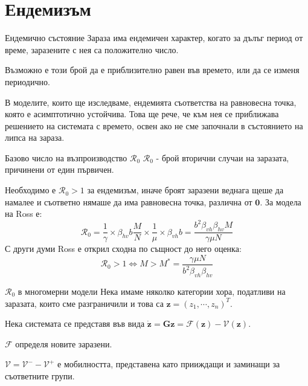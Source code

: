 \section{Ендемизъм}
\begin{frame}[t]{Ендемично състояние}
  Зараза има ендемичен характер, когато за дълъг период от време, заразените с нея са положително число.

  Възможно е този брой да е приблизително равен във времето, или да се изменя периодично.

  В моделите, които ще изследваме, ендемията съответства на равновесна точка, която е асимптотично устойчива. Това ще рече, че към нея се приближава решението на системата с времето, освен ако не сме започнали в състоянието на липса на зараза.
\end{frame}

\begin{frame}[t]{Базово число на възпроизводство $\mathscr{R}_0$}
  $\mathscr{R}_0$ - брой вторични случаи на заразата, причинени от един първичен.
  
  Необходимо е $\mathscr{R}_0 > 1$ за ендемизъм,
  иначе броят заразени веднага щеше да намалее и съответно нямаше да има равновесна точка, различна от $\boldsymbol{0}$. За модела на Ross е:
  \begin{equation}
    \mathscr{R}_0 = \frac{1}{\gamma} \times \beta_{hv} b \frac{M}{N} \times \frac{1}{\mu} \times \beta_{vh} b = \frac{b^2 \beta_{vh} \beta_{hv} M}{\gamma \mu N}
  \end{equation}
  С други думи Ross е открил сходна по същност до него оценка:
  \begin{equation}
    \mathscr{R}_0 > 1 \iff M > M^* = \frac{\gamma \mu N}{b^2 \beta_{vh} \beta_{hv}}
  \end{equation}
\end{frame}

\begin{frame}[t]{$\mathscr{R}_0$ в многомерни модели}
  Нека имаме няколко категории хора, податливи на заразата, които сме разграничили и това са $\boldsymbol{z} = (z_1, \cdots, z_n)^T$.

  Нека системата се представя във вида $\dot{\boldsymbol{z}} = \boldsymbol{G}{\boldsymbol{z}} = \mathscr{F}(\boldsymbol{z}) - \mathscr{V}(\boldsymbol{z})$.

  $\mathscr{F}$ определя новите заразени.

  $\mathscr{V} = \mathscr{V}^- - \mathscr{V}^+$ е мобилността, представена като прииждащи и заминащи за съответните групи.
\end{frame}

